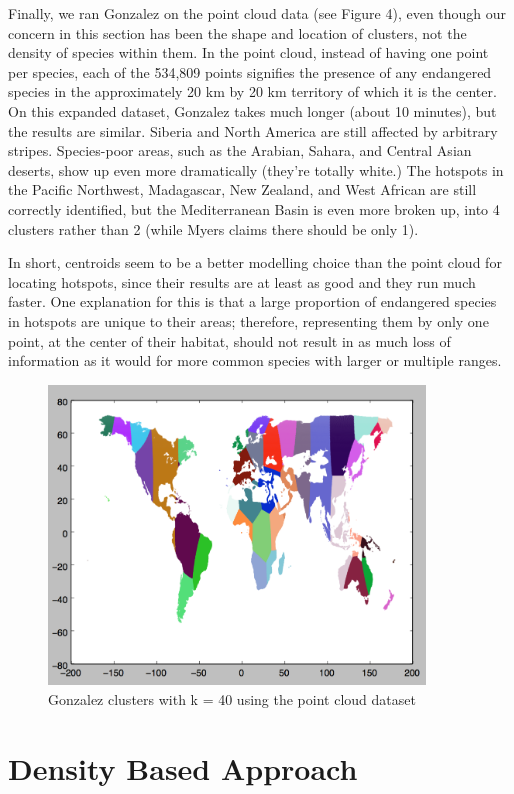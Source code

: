 \documentclass[11pt, fullpage,letterpaper]{article}
\begin{document}
		Finally, we ran Gonzalez on the point cloud data (see Figure 4), even though our concern in this section has been the shape and location of clusters, not the density of species within them. In the point cloud, instead of having one point per species, each of the 534,809 points signifies the presence of any endangered species in the approximately 20 km by 20 km territory of which it is the center. On this expanded dataset, Gonzalez takes much longer (about 10 minutes), but the results are similar. Siberia and North America are still affected by arbitrary stripes. Species-poor areas, such as the Arabian, Sahara, and Central Asian deserts, show up even more dramatically (they're totally white.) The hotspots in the Pacific Northwest, Madagascar, New Zealand, and West African are still correctly identified, but the Mediterranean Basin is even more broken up, into 4 clusters rather than 2 (while Myers claims there should be only 1).
		
		In short, centroids seem to be a better modelling choice than the point cloud for locating hotspots, since their results are at least as good and they run much faster. One explanation for this is that a large proportion of endangered species in hotspots are unique to their areas; therefore, representing them by only one point, at the center of their habitat, should not result in as much loss of information as it would for more common species with larger or multiple ranges. 
		
		\begin{figure}[H]
			\centering
			\includegraphics[width=10cm]{gonzalezPointCloud.png}
			\caption{Gonzalez clusters with k = 40 using the point cloud dataset}
		\end{figure}

	\section{Density Based Approach}
\end{document}
